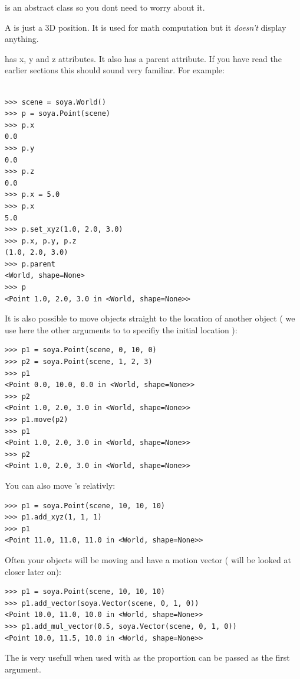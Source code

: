  is an abstract class so you dont need to worry about it. 

A  is just a 3D position. It is used for math computation but
it \emph{doesn't} display anything. 

 has x, y and z attributes. It also has a parent attribute. 
If you have read the earlier sections this should sound very familiar. 
For example:

\begin{verbatim}

>>> scene = soya.World()
>>> p = soya.Point(scene)
>>> p.x
0.0
>>> p.y
0.0
>>> p.z
0.0
>>> p.x = 5.0
>>> p.x
5.0
>>> p.set_xyz(1.0, 2.0, 3.0)
>>> p.x, p.y, p.z
(1.0, 2.0, 3.0)
>>> p.parent
<World, shape=None>
>>> p
<Point 1.0, 2.0, 3.0 in <World, shape=None>>

\end{verbatim}

It is also possible to move objects straight to the location of another object
( we use here the other arguments to  to specifiy the initial
location ):

\begin{verbatim}
>>> p1 = soya.Point(scene, 0, 10, 0)
>>> p2 = soya.Point(scene, 1, 2, 3)
>>> p1
<Point 0.0, 10.0, 0.0 in <World, shape=None>>
>>> p2
<Point 1.0, 2.0, 3.0 in <World, shape=None>>
>>> p1.move(p2)
>>> p1
<Point 1.0, 2.0, 3.0 in <World, shape=None>>
>>> p2
<Point 1.0, 2.0, 3.0 in <World, shape=None>>
\end{verbatim}

You can also move 's relativly:
\begin{verbatim}
>>> p1 = soya.Point(scene, 10, 10, 10)
>>> p1.add_xyz(1, 1, 1)
>>> p1
<Point 11.0, 11.0, 11.0 in <World, shape=None>>
\end{verbatim}

Often your objects will be moving and have a motion vector
(  will be looked at closer later on):
\begin{verbatim}
>>> p1 = soya.Point(scene, 10, 10, 10)
>>> p1.add_vector(soya.Vector(scene, 0, 1, 0))
<Point 10.0, 11.0, 10.0 in <World, shape=None>>
>>> p1.add_mul_vector(0.5, soya.Vector(scene, 0, 1, 0))
<Point 10.0, 11.5, 10.0 in <World, shape=None>>
\end{verbatim}

The  is very usefull when used with 
 as the proportion can be passed as the 
first argument. 

